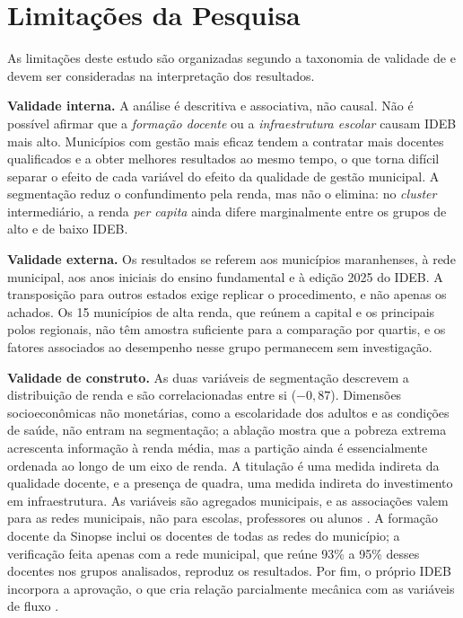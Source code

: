 \section{Limitações da Pesquisa}
\label{sec:limitations}

As limitações deste estudo são organizadas segundo a taxonomia de validade de \citet{Wohlin2012} e devem ser consideradas na interpretação dos resultados.

\textbf{Validade interna.} A análise é descritiva e associativa, não causal. Não é possível afirmar que a \textit{formação docente} ou a \textit{infraestrutura escolar} causam IDEB mais alto. Municípios com gestão mais eficaz tendem a contratar mais docentes qualificados e a obter melhores resultados ao mesmo tempo, o que torna difícil separar o efeito de cada variável do efeito da qualidade de gestão municipal. A segmentação reduz o confundimento pela renda, mas não o elimina: no \textit{cluster} intermediário, a renda \textit{per capita} ainda difere marginalmente entre os grupos de alto e de baixo IDEB.

\textbf{Validade externa.} Os resultados se referem aos municípios maranhenses, à rede municipal, aos anos iniciais do ensino fundamental e à edição 2025 do IDEB. A transposição para outros estados exige replicar o procedimento, e não apenas os achados. Os 15 municípios de alta renda, que reúnem a capital e os principais polos regionais, não têm amostra suficiente para a comparação por quartis, e os fatores associados ao desempenho nesse grupo permanecem sem investigação.

\textbf{Validade de construto.} As duas variáveis de segmentação descrevem a distribuição de renda e são correlacionadas entre si ($-0{,}87$). Dimensões socioeconômicas não monetárias, como a escolaridade dos adultos e as condições de saúde, não entram na segmentação; a ablação mostra que a pobreza extrema acrescenta informação à renda média, mas a partição ainda é essencialmente ordenada ao longo de um eixo de renda. A titulação é uma medida indireta da qualidade docente, e a presença de quadra, uma medida indireta do investimento em infraestrutura. As variáveis são agregados municipais, e as associações valem para as redes municipais, não para escolas, professores ou alunos \citep{robinson1950}. A formação docente da Sinopse inclui os docentes de todas as redes do município; a verificação feita apenas com a rede municipal, que reúne 93\% a 95\% desses docentes nos grupos analisados, reproduz os resultados. Por fim, o próprio IDEB incorpora a aprovação, o que cria relação parcialmente mecânica com as variáveis de fluxo \citep{soares2013}.

